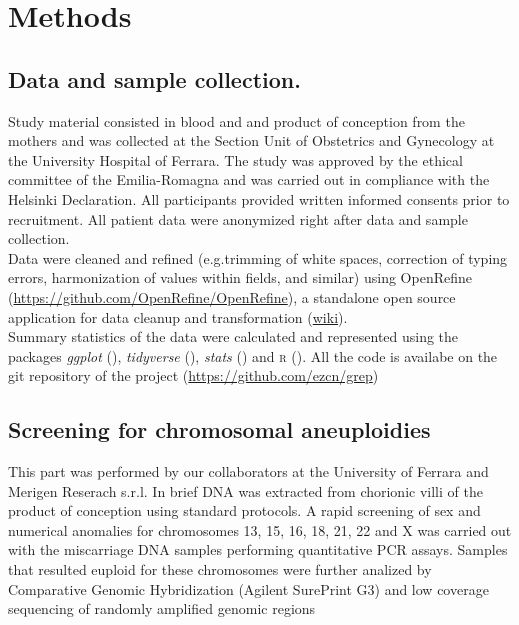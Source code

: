 \chapter{Methods}

\section{Data and sample collection.} Study material consisted in blood and and product of conception from the mothers and was collected at the Section Unit of Obstetrics and Gynecology at the University Hospital of Ferrara. The study was approved by the ethical committee of the Emilia-Romagna and was carried out in compliance with the Helsinki Declaration. All participants provided written informed consents prior to recruitment. All patient data were anonymized right after data and sample collection.\\ 

Data were cleaned and refined (e.g.trimming of white spaces, correction of typing errors, harmonization of values within fields, and similar) using OpenRefine (\url{https://github.com/OpenRefine/OpenRefine}), a standalone open source application for data cleanup and transformation (\href{https://en.wikipedia.org/wiki/OpenRefine}{wiki}).\\

Summary statistics of the data were calculated and represented using the packages \textit{ggplot} (\cite{ggplot2}), \textit{tidyverse} (\cite{wickham2019welcome}), \textit{stats} (\cite{statsR}) and \textsc{r} (\cite{R}). All the code is availabe on the git repository of the project (\url{https://github.com/ezcn/grep}) 

\section{Screening for chromosomal aneuploidies}

This part was performed by our collaborators at the University of Ferrara and Merigen Reserach s.r.l. In brief DNA was extracted from chorionic villi of the product of conception using standard protocols. A rapid screening of sex and numerical anomalies for chromosomes 13, 15, 16, 18, 21, 22 and X was carried out with the miscarriage DNA samples performing quantitative PCR assays. Samples that resulted euploid for these chromosomes were further analized by Comparative Genomic Hybridization (Agilent SurePrint G3) and low coverage sequencing of randomly amplified genomic regions


